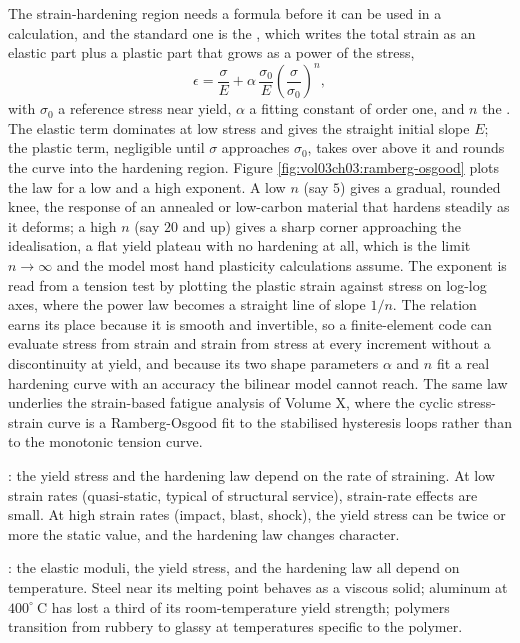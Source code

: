 The strain-hardening region needs a formula before it can be used in a
calculation, and the standard one is the , which writes the total strain as an elastic part plus a plastic
part that grows as a power of the stress,
\[
\epsilon = \frac{\sigma}{E} + \alpha\,\frac{\sigma_0}{E}\left(\frac{\sigma}
{\sigma_0}\right)^{n},
\]
with $\sigma_0$ a reference stress near yield, $\alpha$ a fitting
constant of order one, and $n$ the . The
elastic term dominates at low stress and gives the straight initial slope
$E$; the plastic term, negligible until $\sigma$ approaches $\sigma_0$,
takes over above it and rounds the curve into the hardening region.
Figure \ref{fig:vol03ch03:ramberg-osgood} plots the law for a low and a
high exponent. A low $n$ (say $5$) gives a gradual, rounded knee, the
response of an annealed or low-carbon material that hardens steadily as it
deforms; a high $n$ (say $20$ and up) gives a sharp corner approaching the
 idealisation, a flat yield plateau with
no hardening at all, which is the limit $n \to \infty$ and the model most
hand plasticity calculations assume. The exponent is read from a tension
test by plotting the plastic strain against stress on log-log axes, where
the power law becomes a straight line of slope $1/n$. The relation earns
its place because it is smooth and invertible, so a finite-element code
can evaluate stress from strain and strain from stress at every increment
without a discontinuity at yield, and because its two shape parameters
$\alpha$ and $n$ fit a real hardening curve with an accuracy the bilinear
model cannot reach. The same law underlies the strain-based fatigue
analysis of Volume X, where the cyclic stress-strain curve is a
Ramberg-Osgood fit to the stabilised hysteresis loops rather than to the
monotonic tension curve.



: the yield stress and the
hardening law depend on the rate of straining. At low strain rates
(quasi-static, typical of structural service), strain-rate effects
are small. At high strain rates (impact, blast, shock), the yield
stress can be twice or more the static value, and the hardening law
changes character.

: the elastic moduli, the yield
stress, and the hardening law all depend on temperature. Steel near
its melting point behaves as a viscous solid; aluminum at $400^{\circ}\
\mathrm{C}$ has lost a third of its room-temperature yield strength;
polymers transition from rubbery to glassy at temperatures specific
to the polymer.


